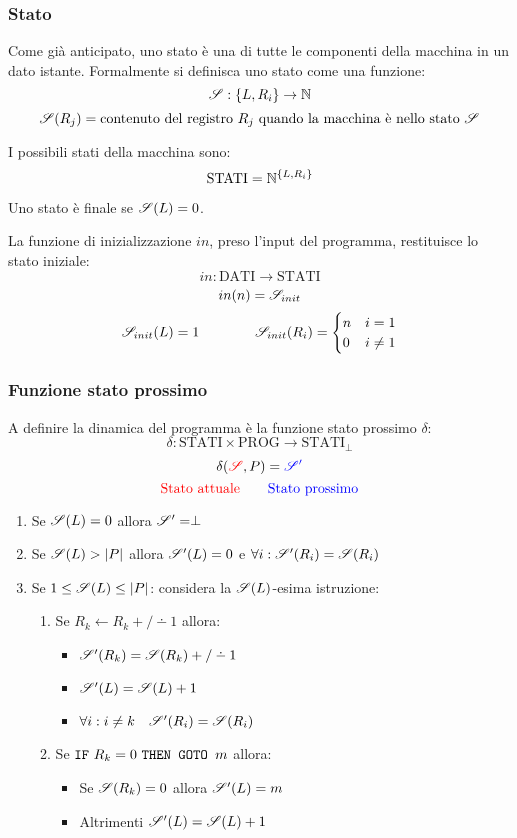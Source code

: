 \subsubsection*{Stato}
Come già anticipato, uno stato è una  di tutte le componenti della macchina
in un dato istante. Formalmente si definisca uno stato come una funzione:
$$ \mathscr{S}:\{L,R_i\}\to\mathbb{N} $$
$$ \mathscr{S}(R_j) = \text{contenuto del registro $R_j$ quando la macchina è nello stato 
$\mathscr{S}$}$$

I possibili stati della macchina sono:
$$ \text{STATI} = \mathbb{N}^{\{L,R_i\}} $$

Uno stato è finale se $\mathscr{S}(L)=0$.

La funzione di inizializzazione $in$, preso l'input del programma, restituisce lo stato
iniziale:
$$ in:\text{DATI}\to\text{STATI} $$
$$ in(n) = \mathscr{S}_{init} $$
$$ \mathscr{S}_{init}(L) = 1 \qquad\qquad \mathscr{S}_{init}(R_i) = \begin{cases}
n & i=1\\
0 & i\neq 1
\end{cases} $$

\subsubsection*{Funzione stato prossimo}
A definire la dinamica del programma è la funzione stato prossimo $\delta$:
$$ \delta : \text{STATI}\times\text{PROG}\to\text{STATI}_\perp $$
$$ \delta({\color{red}\mathscr{S}},P) = {\color{blue}\mathscr{S}'} $$
$$ {\color{red}\text{Stato attuale}} \qquad {\color{blue}\text{Stato prossimo}} $$

\begin{enumerate}
    \item Se $\mathscr{S}(L)=0$ allora $\mathscr{S}'=\perp$
    \item Se $\mathscr{S}(L)>|P|$ allora $\mathscr{S}'(L)=0$ e $\forall i:\mathscr{S}'(R_i)=\mathscr{S}(R_i)$
    \item Se $1\leq\mathscr{S}(L)\leq |P|$: considera la $\mathscr{S}(L)$-esima istruzione:
        \begin{enumerate}
            \item Se $R_k \leftarrow R_k +/\dotminus 1$ allora:
                \begin{itemize}
                    \item $\Stato'(R_k) = \Stato(R_k)+/\dotminus 1$
                    \item $\mathscr{S}'(L) = \mathscr{S}(L)+1$
                    \item $\forall i:i\neq k \quad \mathscr{S}'(R_i) = \mathscr{S}(R_i)$
                \end{itemize}
            \item Se $\texttt{IF}\text{ $R_k=0$ }\texttt{THEN GOTO }\text{$m$}$ allora:
                \begin{itemize}
                    \item Se $\mathscr{S}(R_k)=0$ allora $\mathscr{S}'(L) = m$
                    \item Altrimenti $\mathscr{S}'(L) = \mathscr{S}(L)+1$
                \end{itemize}
        \end{enumerate}
\end{enumerate}

